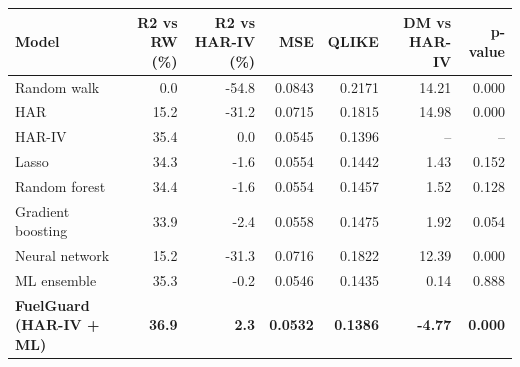 \begin{tabular}{lrrrrrr}
\toprule
Model & R2 vs RW (\%) & R2 vs HAR-IV (\%) & MSE & QLIKE & DM vs HAR-IV & p-value \\
\midrule
Random walk & 0.0 & -54.8 & 0.0843 & 0.2171 & 14.21 & 0.000 \\
HAR & 15.2 & -31.2 & 0.0715 & 0.1815 & 14.98 & 0.000 \\
HAR-IV & 35.4 & 0.0 & 0.0545 & 0.1396 & -- & -- \\
Lasso & 34.3 & -1.6 & 0.0554 & 0.1442 & 1.43 & 0.152 \\
Random forest & 34.4 & -1.6 & 0.0554 & 0.1457 & 1.52 & 0.128 \\
Gradient boosting & 33.9 & -2.4 & 0.0558 & 0.1475 & 1.92 & 0.054 \\
Neural network & 15.2 & -31.3 & 0.0716 & 0.1822 & 12.39 & 0.000 \\
ML ensemble & 35.3 & -0.2 & 0.0546 & 0.1435 & 0.14 & 0.888 \\
\textbf{FuelGuard (HAR-IV + ML)} & \textbf{36.9} & \textbf{2.3} & \textbf{0.0532} & \textbf{0.1386} & \textbf{-4.77} & \textbf{0.000} \\
\bottomrule
\end{tabular}
